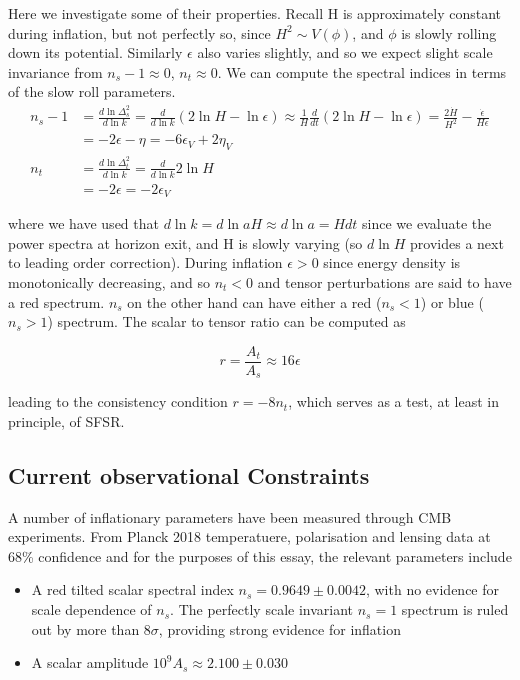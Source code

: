 \documentclass[a4paper,10pt]{article}
\begin{document}
Here we investigate some of their properties. Recall H is approximately constant during inflation, but not perfectly so, since $H^2 \sim V(\phi)$, and $\phi$ is slowly rolling down its potential. Similarly $\epsilon$ also varies slightly, and so we expect slight scale invariance from $n_s-1\approx0$, $n_t\approx0$. We can compute the spectral indices in terms of the slow roll parameters. 
\begin{equation}\begin{split}
n_s-1 &= \frac{d\ln{\Delta^2_s}}{d\ln{k}} = \frac{d}{d\ln{k}}(2\ln{H}-\ln{\epsilon}) \approx \frac{1}{H}\frac{d}{dt}(2\ln{H}-\ln{\epsilon}) = \frac{2\dot{H}}{H^2}-\frac{\dot{\epsilon}}{H\epsilon}\\
& = -2\epsilon-\eta = -6\epsilon_V+2\eta_V\\
n_t &= \frac{d\ln{\Delta^2_t}}{d\ln{k}} = \frac{d}{d\ln{k}}2\ln{H}\\
&=-2\epsilon=-2\epsilon_V
\end{split}\end{equation}

where we have used that $d\ln{k} = d\ln{aH} \approx d\ln{a} = Hdt$ since we evaluate the power spectra at horizon exit, and H is slowly varying (so $d\ln{H}$ provides a next to leading order correction). During inflation $\epsilon>0$ since energy density is monotonically decreasing, and so $n_t<0$ and tensor perturbations are said to have a red spectrum. $n_s$ on the other hand can have either a red ($n_s<1$) or blue ($n_s>1$) spectrum. The scalar to tensor ratio can be computed as

\begin{equation}
r=\frac{A_t}{A_s} \approx 16\epsilon
\end{equation}

leading to the consistency condition $r=-8n_t$, which serves as a test, at least in principle, of SFSR.


\subsection{Current observational Constraints}


A number of inflationary parameters have been measured through CMB experiments. From Planck 2018 temperatuere, polarisation and lensing data at 68\% confidence and for the purposes of this essay, the relevant parameters include \cite{Planck}
 
\begin{itemize}
\item A red tilted scalar spectral index $n_s =0.9649 \pm 0.0042$, with no evidence for scale dependence of $n_s$. The perfectly scale invariant $n_s=1$ spectrum is ruled out by more than $8\sigma$, providing strong evidence for inflation
\item A scalar amplitude  $10^9 A_s \approx 2.100 \pm 0.030$
\end{itemize}
\end{document}
